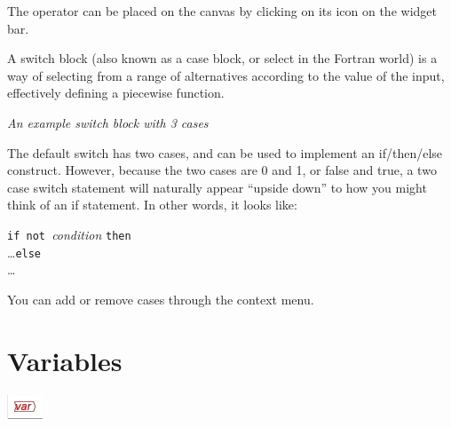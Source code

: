 The operator can be placed on the canvas by clicking on its icon on
the widget bar.

 A switch block (also known as a case
block, or select in the Fortran world) is a way of selecting from
a range of alternatives according to the value of the input, effectively
defining a piecewise function.
\begin{center}
 {\em
An example switch block with 3 cases} 
\par\end{center}

The default switch has two cases, and can be used to implement an
if/then/else construct. However, because the two cases are 0 and 1,
or false and true, a two case switch statement will naturally appear
``upside down'' to how you might think of an if statement. In other
words, it looks like:

\noindent\parbox[c]{1\textwidth}{%
 \texttt{if not }{\em condition} \texttt{then}\\
 \ldots\texttt{else}\\
 \ldots %
}

You can add or remove cases through the context menu.

\section{Variables}

\label{Variables}\label{Variable:constant}\label{VarConstant}\label{Variable:parameter}
\label{Variable:flow}\label{Variable:integral}\label{Variable:stock}

\includegraphics{images/var}


